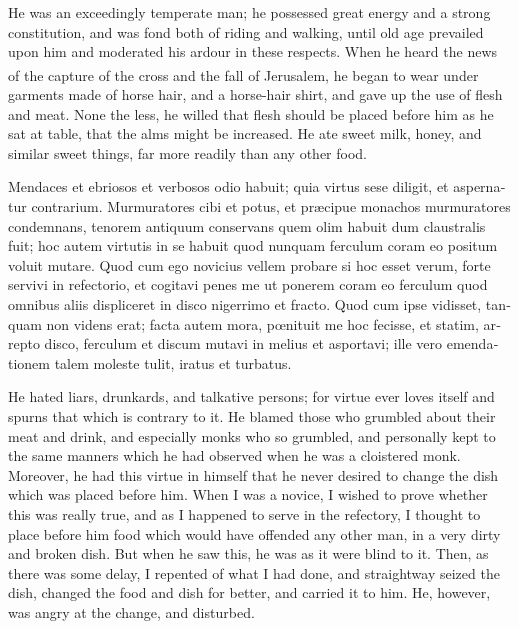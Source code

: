 \documentclass[10pt]{book}
\newcounter{engnote}
\newcommand{\engnotenum}{\textsuperscript{\arabic{engnote}\stepcounter{engnote}}}
\begin{document}
\begin{paracol}{2}
\switchcolumn

He was an exceedingly temperate man; he possessed great energy and a strong constitution, and was fond both of riding and walking, until old age prevailed upon him and moderated his ardour in these respects. When he heard the news of the capture of the cross and the fall of Jerusalem,\engnotenum{} he began to wear under garments made of horse hair, and a horse-hair shirt, and gave up the use of flesh and meat. None the less, he willed that flesh should be placed before him as he sat at table, that the alms might be increased. He ate sweet milk, honey, and similar sweet things, far more readily than any other food.

\switchcolumn*

\begin{otherlanguage}{latin}
Mendaces et ebriosos et verbosos odio habuit; quia virtus sese diligit, et aspernatur contrarium. Murmuratores cibi et potus, et pr\ae{}cipue monachos murmuratores condemnans, tenorem antiquum conservans quem olim habuit dum claustralis fuit; hoc autem virtutis in se habuit quod nunquam ferculum coram eo positum voluit mutare. Quod cum ego novicius vellem probare si hoc esset verum, forte servivi in refectorio, et cogitavi penes me ut ponerem coram eo ferculum quod omnibus aliis displiceret in disco nigerrimo et fracto. Quod cum ipse vidisset, tanquam non videns erat; facta autem mora, p\oe{}nituit me hoc fecisse, et statim, arrepto disco, ferculum et discum mutavi in melius et asportavi; ille vero emendationem talem moleste tulit, iratus et turbatus.
\end{otherlanguage}

\switchcolumn

He hated liars, drunkards, and talkative persons; for virtue ever loves itself and spurns that which is contrary to it. He blamed those who grumbled about their meat and drink, and especially monks who so grumbled, and personally kept to the same manners which he had observed when he was a cloistered monk. Moreover, he had this virtue in himself that he never desired to change the dish which was placed before him. When I was a novice, I wished to prove whether this was really true, and as I happened to serve in the refectory, I thought to place before him food which would have offended any other man, in a very dirty and broken dish. But when he saw this, he was as it were blind to it. Then, as there was some delay, I repented of what I had done, and straightway seized the dish, changed the food and dish for better, and carried it to him. He, however, was angry at the change, and disturbed.


\end{paracol}
\end{document}
